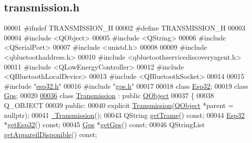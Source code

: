 \hypertarget{transmission_8h_source}{}\subsection{transmission.\+h}
\label{transmission_8h_source}

\begin{DoxyCode}
00001 \textcolor{preprocessor}{#ifndef TRANSMISSION\_H}
00002 \textcolor{preprocessor}{#define TRANSMISSION\_H}
00003 
00004 \textcolor{preprocessor}{#include <QObject>}
00005 \textcolor{preprocessor}{#include <QString>}
00006 \textcolor{preprocessor}{#include <QSerialPort>}
00007 \textcolor{preprocessor}{#include <unistd.h>}
00008 
00009 \textcolor{preprocessor}{#include <qbluetoothaddress.h>}
00010 \textcolor{preprocessor}{#include <qbluetoothservicediscoveryagent.h>}
00011 \textcolor{preprocessor}{#include <QLowEnergyController>}
00012 \textcolor{preprocessor}{#include <QBluetoothLocalDevice>}
00013 \textcolor{preprocessor}{#include <QBluetoothSocket>}
00014 
00015 \textcolor{preprocessor}{#include "\hyperlink{esp32_8h}{esp32.h}"}
00016 \textcolor{preprocessor}{#include "\hyperlink{gps_8h}{gps.h}"}
00017 
00018 \textcolor{keyword}{class }\hyperlink{class_esp32}{Esp32};
00019 \textcolor{keyword}{class }\hyperlink{class_gps}{Gps};
00020 
\hypertarget{transmission_8h_source.tex_l00036}{}\hyperlink{class_transmission}{00036} \textcolor{keyword}{class }\hyperlink{class_transmission}{Transmission} : \textcolor{keyword}{public} \hyperlink{class_q_object}{QObject}
00037 \{
00038     Q\_OBJECT
00039 \textcolor{keyword}{public}:
00040     \textcolor{keyword}{explicit} \hyperlink{class_transmission_a1d8087d2d09b9ddd4fd6e8261daed9f3}{Transmission}(\hyperlink{class_q_object}{QObject} *parent = \textcolor{keyword}{nullptr});    
00041     \hyperlink{class_transmission_adcdc6012d99ddb1d0c3159d50984e146}{~Transmission}();                                     
00043     QString \hyperlink{class_transmission_a3fc179158c8c9e2cceba36423ef92505}{getTrame}() \textcolor{keyword}{const};                            
00044     \hyperlink{class_esp32}{Esp32} *\hyperlink{class_transmission_afccd88f8be8c204a0960bc2d6970931f}{getEsp32}() \textcolor{keyword}{const};                             
00045     \hyperlink{class_gps}{Gps} *\hyperlink{class_transmission_aa5004c178152de5b94ef14e11e80792c}{getGps}() \textcolor{keyword}{const};                                 
00046     QStringList \hyperlink{class_transmission_a2a38d0633b4a27dfa3754efcd3db4f9c}{getAppareilDisponible}() \textcolor{keyword}{const};               

\end{DoxyCode}

